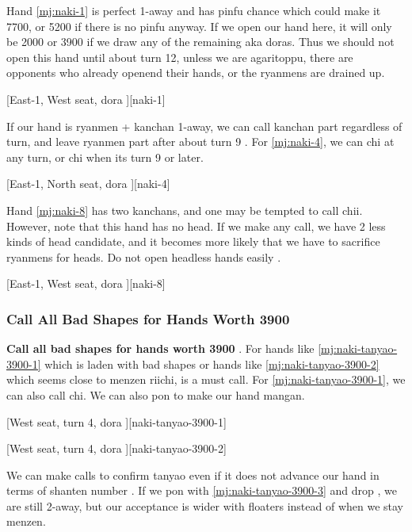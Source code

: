 \documentclass[12pt]{article}
\begin{document}
Hand \ref{mj:naki-1} is perfect 1-away and has pinfu chance which could make it 7700, or 5200 if there is no pinfu anyway. If we open our hand here, it will only be 2000 or 3900 if we draw any of the remaining aka doras. Thus we should not open this hand until about turn 12, unless we are agaritoppu, there are opponents who already openend their hands, or the ryanmens are drained up.

[East-1, West seat, dora ][naki-1]

If our hand is ryanmen + kanchan 1-away, we can call kanchan part regardless of turn, and leave ryanmen part after about turn 9 \citep[][p.~40]{hirasawa-naki}. For \ref{mj:naki-4}, we can chi  at any turn, or chi  when its turn 9 or later.

[East-1, North seat, dora ][naki-4]

Hand \ref{mj:naki-8} has two kanchans, and one may be tempted to call  chii. However, note that this hand has no head. If we make any call, we have 2 less kinds of head candidate, and it becomes more likely that we have to sacrifice ryanmens for heads. Do not open headless hands easily \citep[][p.~55]{hirasawa-naki}.

[East-1, West seat, dora ][naki-8]


\subsubsection*{Call All Bad Shapes for Hands Worth 3900}

\textbf{Call all bad shapes for hands worth 3900} \citep[][pp.~176--181]{tetsusenryaku}. For hands like \ref{mj:naki-tanyao-3900-1} which is laden with bad shapes or hands like \ref{mj:naki-tanyao-3900-2} which seems close to menzen riichi,  is a must call. For \ref{mj:naki-tanyao-3900-1}, we can also call  chi. We can also pon  to make our hand mangan.

[West seat, turn 4, dora ][naki-tanyao-3900-1]

[West seat, turn 4, dora ][naki-tanyao-3900-2]

We can make calls to confirm tanyao even if it does not advance our hand in terms of shanten number \citep[][pp.~127--128]{hirasawa-naki}. If we pon  with \ref{mj:naki-tanyao-3900-3} and drop , we are still 2-away, but our acceptance is wider with  floaters instead of  when we stay menzen.
\end{document}
